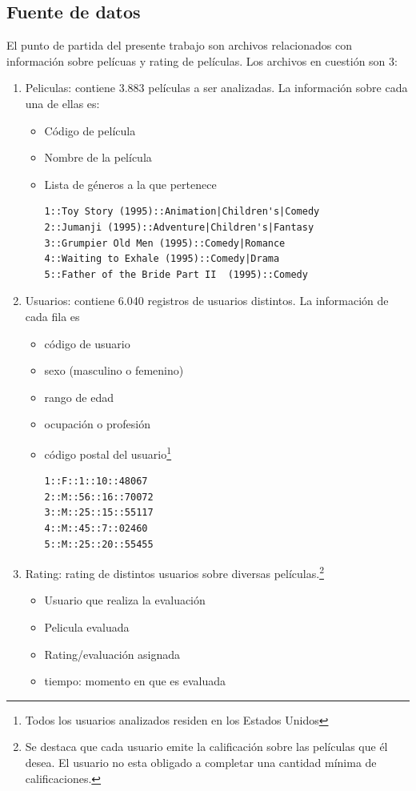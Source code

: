 \documentclass[journal]{IEEEtran}
\begin{document}
\subsection{Fuente de datos}
El punto de partida del presente trabajo son  archivos relacionados con información
sobre pelícuas y rating de películas. Los archivos en cuestión son 3:
\begin{enumerate}
	\item Peliculas: contiene 3.883 películas a ser analizadas. La información sobre cada
		una de ellas es:
		\begin{itemize}
			\item Código de película
			\item Nombre de la película
			\item Lista de géneros a la que pertenece
				\begin{lstlisting}[frame=single, breaklines=true]
1::Toy Story (1995)::Animation|Children's|Comedy
2::Jumanji (1995)::Adventure|Children's|Fantasy
3::Grumpier Old Men (1995)::Comedy|Romance
4::Waiting to Exhale (1995)::Comedy|Drama
5::Father of the Bride Part II  (1995)::Comedy
				\end{lstlisting}
		\end{itemize}


	\item Usuarios: contiene 6.040 registros de usuarios distintos. La información de cada
		fila es
		\begin{itemize}
			\item código de usuario
			\item sexo (masculino o femenino)
			\item rango de edad
			\item ocupación o profesión
			\item código postal del usuario\footnote{Todos los usuarios analizados residen 
			  en los Estados Unidos}
				\begin{lstlisting}[frame=single]
1::F::1::10::48067
2::M::56::16::70072
3::M::25::15::55117
4::M::45::7::02460
5::M::25::20::55455
				\end{lstlisting}
		\end{itemize}

	\item Rating: rating de distintos usuarios sobre diversas películas.\footnote{Se
		destaca que cada usuario emite la calificación sobre las películas que él desea. El
		usuario no esta obligado a completar una cantidad mínima de calificaciones.}

		\begin{itemize}
			\item Usuario que realiza la evaluación
			\item Pelicula evaluada
			\item Rating/evaluación asignada
			\item tiempo: momento en que es evaluada


\end{itemize}
\end{enumerate}
\end{document}
